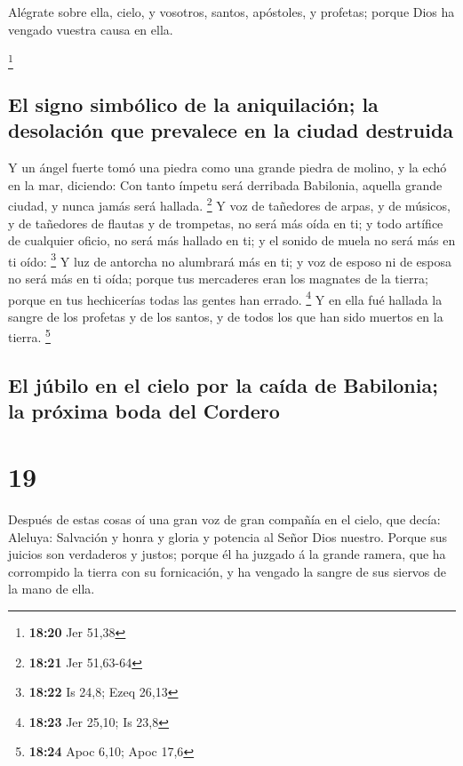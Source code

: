  Alégrate sobre ella, cielo, y vosotros, santos, apóstoles,
y profetas; porque Dios ha vengado vuestra causa en ella.

\footnote{\textbf{18:20} Jer 51,38}

\hypertarget{el-signo-simbuxf3lico-de-la-aniquilaciuxf3n-la-desolaciuxf3n-que-prevalece-en-la-ciudad-destruida}{%
\subsection{El signo simbólico de la aniquilación; la desolación que
prevalece en la ciudad
destruida}\label{el-signo-simbuxf3lico-de-la-aniquilaciuxf3n-la-desolaciuxf3n-que-prevalece-en-la-ciudad-destruida}}

 Y un ángel fuerte tomó una piedra como una grande piedra
de molino, y la echó en la mar, diciendo: Con tanto ímpetu será
derribada Babilonia, aquella grande ciudad, y nunca jamás será hallada.
\footnote{\textbf{18:21} Jer 51,63-64}  Y voz de tañedores
de arpas, y de músicos, y de tañedores de flautas y de trompetas, no
será más oída en ti; y todo artífice de cualquier oficio, no será más
hallado en ti; y el sonido de muela no será más en ti oído: \footnote{\textbf{18:22}
  Is 24,8; Ezeq 26,13}  Y luz de antorcha no alumbrará más
en ti; y voz de esposo ni de esposa no será más en ti oída; porque tus
mercaderes eran los magnates de la tierra; porque en tus hechicerías
todas las gentes han errado. \footnote{\textbf{18:23} Jer 25,10; Is 23,8}
 Y en ella fué hallada la sangre de los profetas y de los
santos, y de todos los que han sido muertos en la tierra. \footnote{\textbf{18:24}
  Apoc 6,10; Apoc 17,6}

\hypertarget{el-juxfabilo-en-el-cielo-por-la-cauxedda-de-babilonia-la-pruxf3xima-boda-del-cordero}{%
\subsection{El júbilo en el cielo por la caída de Babilonia; la próxima
boda del
Cordero}\label{el-juxfabilo-en-el-cielo-por-la-cauxedda-de-babilonia-la-pruxf3xima-boda-del-cordero}}

\hypertarget{section-18}{%
\section{19}\label{section-18}}

 Después de estas cosas oí una gran voz de gran compañía en
el cielo, que decía: Aleluya: Salvación y honra y gloria y potencia al
Señor Dios nuestro.  Porque sus juicios son verdaderos y
justos; porque él ha juzgado á la grande ramera, que ha corrompido la
tierra con su fornicación, y ha vengado la sangre de sus siervos de la
mano de ella.

